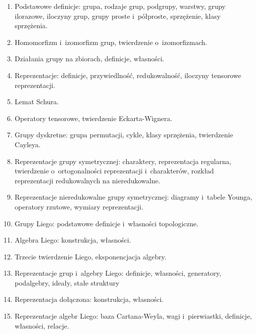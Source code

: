 \documentclass[a4paper,11pt]{article}
\begin{document}
\begin{enumerate}

\item Podstawowe definicje: grupa, rodzaje grup, podgrupy, warstwy, grupy
  ilorazowe, iloczyny grup, grupy proste i~półproste, sprzężenie, klasy
  sprzężenia.

\item Homomorfizm i~izomorfizm grup, twierdzenie o~izomorfizmach.

\item Działania grupy na zbiorach, definicje, własności.

\item Reprezentacje: definicje, przywiedlność, redukowalność, iloczyny
  tensorowe reprezentacji.

\item Lemat Schura.

\item Operatory tensorowe, twierdzenie Eckarta-Wignera.

\item Grupy dyskretne: grupa permutacji, cykle, klasy sprzężenia,
  twierdzenie Cayleya.

\item Reprezentacje grupy symetrycznej: charaktery, reprezentacja regularna, twierdzenie o~ortogonalności reprezentacji i~charakterów, rozkład reprezentacji redukowalnych na nieredukowalne.

\item Reprezentacje nieredukowalne grupy symetrycznej: diagramy i~tabele Younga, operatory rzutowe, wymiary reprezentacji.

\item Grupy Liego: podstawowe definicje i~własności topologiczne.

\item Algebra Liego: konstrukcja, własności.

\item Trzecie twierdzenie Liego, eksponencjacja algebry.

\item Reprezentacje grup i~algebry Liego: definicje, własności, generatory,
  podalgebry, ideały, stałe struktury

\item Reprezentacja dołączona: konstrukcja, własności.

\item Reprezentacje algebr Liego: baza Cartana-Weyla, wagi i~pierwiastki,
  definicje, własności, relacje.


\end{enumerate}
\end{document}

